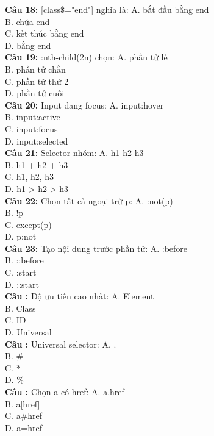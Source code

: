 \documentclass[12pt,a4paper]{article}
\begin{document}
\textbf{Câu 18:} [class\$="end"] nghĩa là:
A. bắt đầu bằng end \\
B. chứa end \\
C. kết thúc bằng end \\
D. bằng end \\

\textbf{Câu 19:} :nth-child(2n) chọn:
A. phần tử lẻ \\
B. phần tử chẵn \\
C. phần tử thứ 2 \\
D. phần tử cuối \\

\textbf{Câu 20:} Input đang focus:
A. input:hover \\
B. input:active \\
C. input:focus \\
D. input:selected \\

\textbf{Câu 21:} Selector nhóm:
A. h1 h2 h3 \\
B. h1 + h2 + h3 \\
C. h1, h2, h3 \\
D. h1 > h2 > h3 \\

\textbf{Câu 22:} Chọn tất cả ngoại trừ p:
A. :not(p) \\
B. !p \\
C. except(p) \\
D. p:not \\

\textbf{Câu 23:} Tạo nội dung trước phần tử:
A. :before \\
B. ::before \\
C. :start \\
D. ::start \\

\textbf{Câu :} Độ ưu tiên cao nhất:
A. Element \\
B. Class \\
C. ID \\
D. Universal \\

\textbf{Câu :} Universal selector:
A. . \\
B. \# \\
C. * \\
D. \% \\

\textbf{Câu :} Chọn a có href:
A. a.href \\
B. a[href] \\
C. a\#href \\
D. a=href \\
\end{document}
